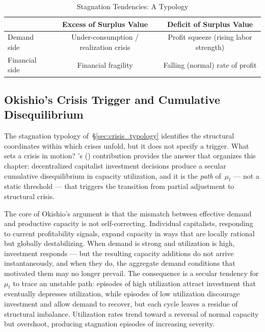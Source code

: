 \documentclass[12pt,letterpaper]{article}
\newcommand{\mut}{\mu_t}           %
\begin{document}
\begin{table}[h]
  \centering
  \caption{Stagnation Tendencies: A Typology}
  \label{tab:typology}
  \begin{tabular}{lcc}
    \toprule
     & Excess of Surplus Value & Deficit of Surplus Value \\
    \midrule
    Demand side     & Under-consumption / realization crisis
                    & Profit squeeze (rising labor strength) \\
    Financial side  & Financial fragility
                    & Falling (normal) rate of profit \\
    \bottomrule
  \end{tabular}
  \bigskip

\end{table}


\subsection{Okishio's Crisis Trigger and Cumulative Disequilibrium}
\label{sec:okishio}

The stagnation typology of~\S\ref{sec:crisis_typology} identifies the
structural coordinates within which crises unfold, but it does not specify a
trigger. What sets a crisis in motion? \citeauthor{okishio1961}'s
(\citeyear{okishio1961}) contribution provides the answer that organizes this
chapter: decentralized capitalist investment decisions produce a secular
cumulative disequilibrium in capacity utilization, and it is the \emph{path}
of~$\mut$ --- not a static threshold --- that triggers the transition from
partial adjustment to structural crisis.

The core of Okishio's argument is that the mismatch between effective demand
and productive capacity is not self-correcting. Individual capitalists,
responding to current profitability signals, expand capacity in ways that are
locally rational but globally destabilizing. When demand is strong and
utilization is high, investment responds --- but the resulting capacity
additions do not arrive instantaneously, and when they do, the aggregate demand
conditions that motivated them may no longer prevail. The consequence is a
secular tendency for $\mut$ to trace an unstable path: episodes of high
utilization attract investment that eventually depresses utilization, while
episodes of low utilization discourage investment and allow demand to recover,
but each cycle leaves a residue of structural imbalance. Utilization rates
trend toward a reversal of normal capacity but overshoot, producing stagnation
episodes of increasing severity.
\end{document}

